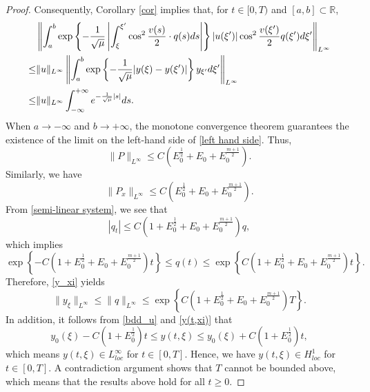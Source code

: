 \documentclass[10pt]{article}
\numberwithin{equation}{section}
\begin{document}
\begin{proof}
		Consequently, Corollary \ref{cor} implies that, for $t\in[0,T)$ and $[a,b]\subset\mathbb{R}$, 
		\begin{align}
			&\left\|\int_{a}^{b}\exp\left\{-\frac{1}{\sqrt{\mu}}\left|\int_{\xi}^{\xi^{\prime}}\cos^{2}\frac{v(s)}{2}\cdot q(s)ds\right|\right\}|u(\xi^{\prime})|\cos^2\frac{v(\xi^{\prime})}{2}q(\xi^{\prime})d\xi^{\prime}\right\|_{L^\infty}\notag\\
			\leq&\|u\|_{L^{\infty}}\left\|\int_{a}^{b}\exp\left\{-\frac{1}{\sqrt{\mu}}|y(\xi)-y(\xi^{\prime})|\right\}y_{\xi^{\prime}}d\xi^{\prime}\right\|_{L^{\infty}}\notag\\
			\leq&\|u\|_{L^{\infty}}\int_{-\infty}^{+\infty}e^{-\frac{1}{\sqrt{\mu}}|s|}ds.\label{left hand side}
		\end{align}
		When $a\to-\infty$ and $b\to+\infty$, the monotone convergence theorem guarantees the existence of the limit on the left-hand side of \eqref{left hand side}. Thus, 
		\begin{equation}
			\|P\|_{L^\infty}\leq C\left(E_0^{\frac{1}{2}}+E_0+E_0^{\frac{m+1}{2}}\right).
		\end{equation}
		Similarly, we have
		\begin{equation}\label{bdd_Px_Linfty}
			\|P_x\|_{L^\infty}\leq C\left(E_0^{\frac{1}{2}}+E_0+E_0^{\frac{m+1}{2}}\right).
		\end{equation}
		From \eqref{semi-linear system}, we see that
		$$
		|q_t|\leq C\left(1+E_0^{\frac{1}{2}}+E_0+E_0^{\frac{m+1}{2}}\right)q,
		$$
		which implies
		\begin{equation}\label{bdd_q(t)}
			\exp\left\{-C\left(1+E_0^{\frac{1}{2}}+E_0+E_0^{\frac{m+1}{2}}\right)t\right\}\leq q(t) \leq\exp\left\{C\left(1+E_0^{\frac{1}{2}}+E_0+E_0^{\frac{m+1}{2}}\right)t\right\}.
		\end{equation}
		Therefore, \eqref{y_xi} yields
		$$
		\|y_\xi\|_{L^\infty}\leq\|q\|_{L^\infty}\leq\exp\left\{C\left(1+E_0^{\frac{1}{2}}+E_0+E_0^{\frac{m+1}{2}}\right)T\right\}.
		$$
		In addition, it follows from \eqref{bdd_u} and \eqref{y(t,xi)} that
		\begin{equation}\label{bdd_y(t,xi)}
			y_0(\xi)-C\left(1+E_0^{\frac{1}{2}}\right)t\leq y(t,\xi)\leq y_0(\xi)+C\left(1+E_0^{\frac{1}{2}}\right)t,
		\end{equation}
		which means $y(t,\xi)\in L^\infty_{loc}$ for $t\in[0,T]$. Hence, we have $y(t,\xi)\in H^1_{loc}$ for $t\in[0,T]$. A contradiction argument shows that $T$ cannot be bounded above, which means that the results above hold for all $t\geq0$.
		

\end{proof}
\end{document}
